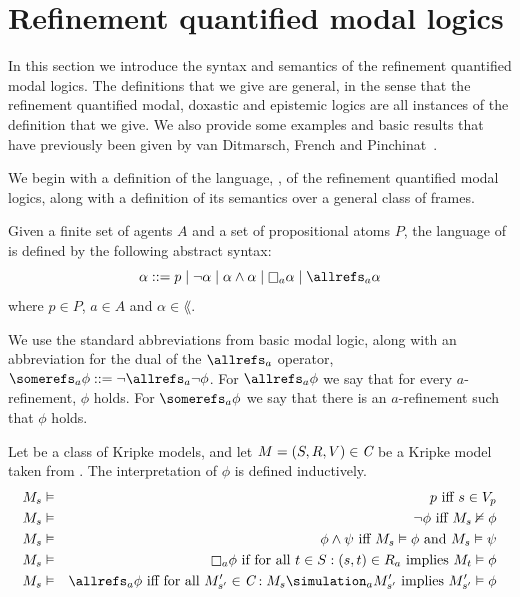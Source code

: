 \section{Refinement quantified modal logics}

In this section we introduce the syntax and semantics of the refinement
quantified modal logics. The definitions that we give are general, in the sense
that the refinement quantified modal, doxastic and epistemic logics are all
instances of the definition that we give. We also provide some examples and
basic results that have previously been given by van Ditmarsch, French and
Pinchinat~\cite{french2010future}.

We begin with a definition of the language, \langF{}, of the refinement
quantified modal logics, along with a definition of its semantics over a general
class of frames.

\begin{definition}
Given a finite set of agents $A$ and a set of propositional atoms $P$, the
language of \langF{} is defined by the following abstract syntax:
$$
\alpha ::=  p \bnfalt
            \neg \alpha \bnfalt
            \alpha \land \alpha \bnfalt
            \knows_a \alpha \bnfalt
            \allrefs_a \alpha
$$
where $p \in P$, $a \in A$ and $\alpha \in \lang{}$.
\end{definition}

We use the standard abbreviations from basic modal logic, along with an
abbreviation for the dual of the $\allrefs_a$ operator, $\somerefs_a \phi ::=
\neg \allrefs_a \neg \phi$. For $\allrefs_a \phi$ we say that for every
$a$-refinement, $\phi$ holds. For $\somerefs_a \phi$ we say that there is an
$a$-refinement such that $\phi$ holds.

\begin{definition}
Let \classC{} be a class of Kripke models, and let $M = (S, R, V) \in \textit{C}$
be a Kripke model taken from \classC{}. The interpretation of $\phi$ is defined
inductively.
\begin{eqnarray*}
M_s &\entails& p \text{ iff } s \in V_p\\
M_s &\entails& \neg \phi \text{ iff } M_s \nentails \phi\\
M_s &\entails& \phi \land \psi \text{ iff } M_s \entails \phi \text{ and } M_s
\entails \psi\\
M_s &\entails& \knows_a \phi \text{ if for all } t \in S : (s, t) \in R_a \text{
implies } M_t \entails \phi\\
M_s &\entails& \allrefs_a \phi \text{ iff for all } M'_{s'} \in \classC : M_s
\simulation_a M'_{s'} \text{ implies } M'_{s'} \entails \phi
\end{eqnarray*}
\end{definition}

